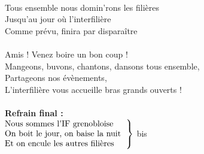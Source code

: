 \\Tous ensemble nous domin'rons les filières
\\Jusqu'au jour où l'interfilière
\\Comme prévu, finira par disparaître
\\\\Amis ! Venez boire un bon coup !
\\Mangeons, buvons, chantons, dansons tous ensemble,
\\Partageons nos évènements,
\\L'interfilière vous accueille bras grands ouverts !
\\\\\textbf{Refrain final :}
\\
$\left . \begin{tabular}{l}
\hspace{-0.4cm}
Nous sommes l'IF grenobloise
\\\hspace{-0.4cm}
On boit le jour, on baise la nuit  
\\\hspace{-0.4cm}
Et on encule les autres filières  
\end{tabular}\right\rbrace$ bis

\breakpage
